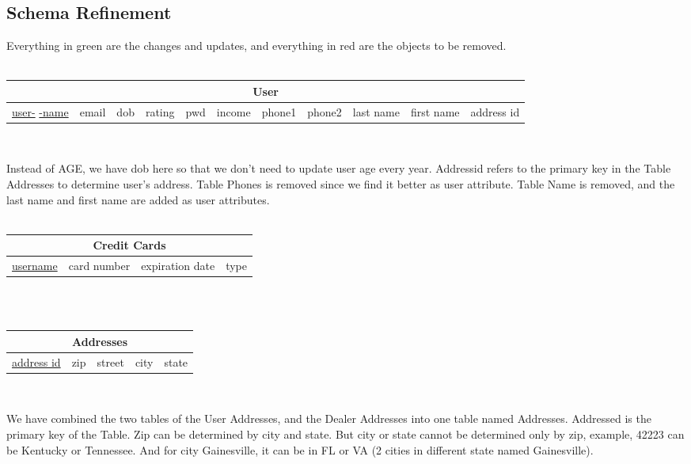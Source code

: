 \documentclass[12pt]{article}
\begin{document}
\subsection{Schema Refinement}
\par Everything in green are the changes and updates, and everything in red are the objects to be removed.\\\\
\begin{tabularx}{\textwidth}{|X|X|X|X|X|X|X|X|X|X|X|}
\hline
\multicolumn{11}{|c|}{User}\\\hline
\scriptsize \underline{user-} \underline{-name} & \scriptsize email & \scriptsize\cellcolor{green!25}dob & \scriptsize rating & \scriptsize pwd & \scriptsize income & \scriptsize\cellcolor{green!25} phone1 & \scriptsize\cellcolor{green!25} phone2 & \scriptsize\cellcolor{green!25} last name & \scriptsize\cellcolor{green!25} first name & \scriptsize\cellcolor{green!25} address id\\\hline
\end{tabularx}
~\\
\par Instead of AGE, we have dob here so that we don't need to update user age every year. Addressid refers to the primary key in the Table Addresses to determine user's address. Table Phones is removed since we find it better as user attribute. Table Name is removed, and the last name and first name are added as user attributes.\\
~\\
\begin{tabularx}{\textwidth}{|X|X|X|X|}
\hline
\multicolumn{4}{|c|}{Credit Cards}\\\hline
\underline{username} & card number & expiration date & type\\\hline
\end{tabularx}
~\\~\\
\begin{tabularx}{\textwidth}{|X|X|X|X|X|}
\hline
\multicolumn{5}{|c|}{\cellcolor{green!25}Addresses}\\\hline
\underline{address id} & \cellcolor{red!25}zip & street & city & state\\\hline
\end{tabularx}
~\\
\par We have combined the two tables of the User Addresses, and the Dealer Addresses into one table named Addresses. Addressed is the primary key of the Table. Zip can be determined by city and state. But city or state cannot be determined only by zip, example, 42223 can be Kentucky or Tennessee. And for city Gainesville, it can be in FL or VA (2 cities in different state named Gainesville).\\
\end{document}

